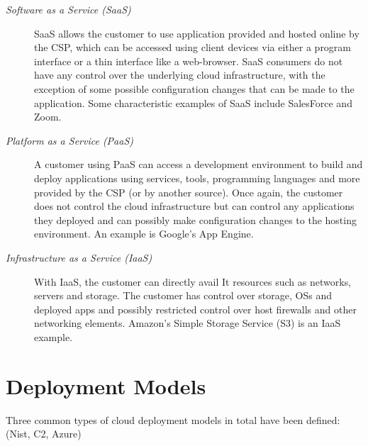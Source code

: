 \begin{description}
	\item [\textit{Software as a Service (SaaS)}] SaaS allows the customer to use application provided and hosted online by the CSP, which can be accessed using client devices via either a program interface or a thin interface like a web-browser. SaaS consumers do not have any control over the underlying cloud infrastructure, with the exception of some possible configuration changes that can be made to the application. Some characteristic examples of SaaS include SalesForce and Zoom.
	
	\item [\textit{Platform as a Service (PaaS)}] A customer using PaaS can access a development environment to build  and deploy applications using services, tools, programming languages and more provided by the CSP (or by another source). Once again, the customer does not control the cloud infrastructure but can control any applications they deployed and can possibly make configuration changes to the hosting environment. An example is Google's App Engine.
	
	\item [\textit{Infrastructure as a Service (IaaS)}] With IaaS, the customer can directly avail It resources such as networks, servers and storage. The customer has control over storage, OSs and deployed apps and possibly restricted control over host firewalls and other networking elements. Amazon's Simple Storage Service (S3) is an IaaS example.
\end{description}


\section{Deployment Models}
Three common types of cloud deployment models in total have been defined: (Nist, C2, Azure)

